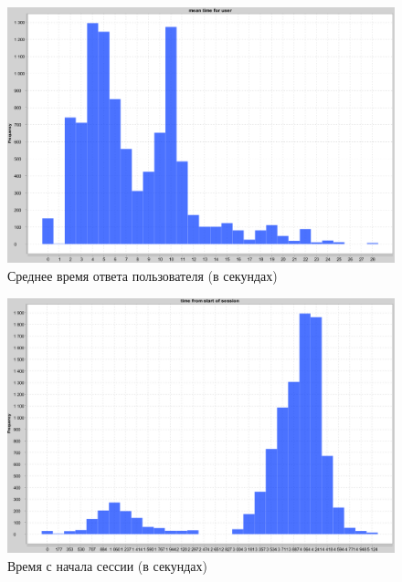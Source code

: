 \documentclass[specification,annotation,times]{itmo-student-thesis}
\begin{document}
\begin{figure}
  \includegraphics[scale=0.5]{mean_time_for_user.PNG}
  \caption{Среднее время ответа пользователя (в секундах)}
  \label{fig:mean_time_for_user}
\end{figure}

\begin{figure}
  \includegraphics[scale=0.5]{time_from_start_of_session.PNG}
  \caption{Время с начала сессии (в секундах)}
  \label{fig:time_from_start_of_session}
\end{figure}
\end{document}
